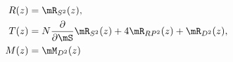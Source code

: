 \begin{equation}
 \begin{split}
 R(z)
 &=
 \mR_{S^2}(z),
 \\
 T(z)
 &=
 N\frac{\partial}{\partial \mS}\mR_{S^2}(z)
 +4\mR_{RP^2}(z) +\mR_{D^2}(z),
 \\
 M(z)&=\mM_{D^2}(z)
 \end{split}
 \label{eq:relation_b/t_resolvents}
\end{equation}

